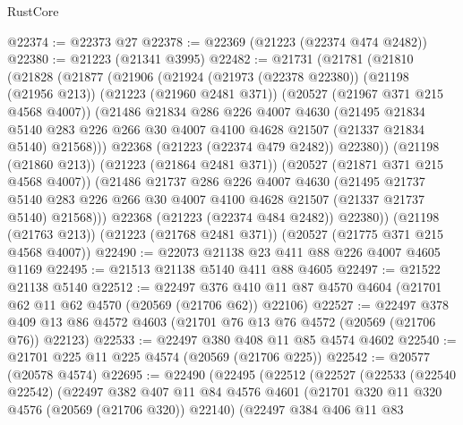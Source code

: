\begin{lexlean}{RustCore}
\begin{coremodule}
@22374 := @22373 @27
@22378 := @22369 (@21223 (@22374 @474 @2482))
@22380 := @21223 (@21341 @3995)
@22482 := @21731
    (@21781
      (@21810
        (@21828
          (@21877
            (@21906
              (@21924
                (@21973 (@22378 @22380))
                (@21198 (@21956 @213))
                (@21223 (@21960 @2481 @371))
                (@20527 (@21967 @371 @215 @4568 @4007))
                (@21486
                  @21834
                  @286
                  @226
                  @4007
                  @4630
                  (@21495
                    @21834
                    @5140
                    @283
                    @226
                    @266
                    @30
                    @4007
                    @4100
                    @4628
                    @21507
                    (@21337 @21834 @5140)
                    @21568)))
              @22368
              (@21223 (@22374 @479 @2482))
              @22380))
          (@21198 (@21860 @213))
          (@21223 (@21864 @2481 @371))
          (@20527 (@21871 @371 @215 @4568 @4007))
          (@21486
            @21737
            @286
            @226
            @4007
            @4630
            (@21495
              @21737
              @5140
              @283
              @226
              @266
              @30
              @4007
              @4100
              @4628
              @21507
              (@21337 @21737 @5140)
              @21568)))
        @22368
        (@21223 (@22374 @484 @2482))
        @22380))
    (@21198 (@21763 @213))
    (@21223 (@21768 @2481 @371))
    (@20527 (@21775 @371 @215 @4568 @4007))
@22490 := @22073 @21138 @23 @411 @88 @226 @4007 @4605 @1169
@22495 := @21513 @21138 @5140 @411 @88 @4605
@22497 := @21522 @21138 @5140
@22512 := @22497
    @376
    @410
    @11
    @87
    @4570
    @4604
    (@21701 @62 @11 @62 @4570 (@20569 (@21706 @62)) @22106)
@22527 := @22497
    @378
    @409
    @13
    @86
    @4572
    @4603
    (@21701 @76 @13 @76 @4572 (@20569 (@21706 @76)) @22123)
@22533 := @22497 @380 @408 @11 @85 @4574 @4602
@22540 := @21701 @225 @11 @225 @4574 (@20569 (@21706 @225))
@22542 := @20577 (@20578 @4574)
@22695 := @22490
    (@22495
      (@22512
        (@22527
          (@22533
            (@22540 @22542)
            (@22497
              @382
              @407
              @11
              @84
              @4576
              @4601
              (@21701 @320 @11 @320 @4576 (@20569 (@21706 @320)) @22140)
              (@22497
                @384
                @406
                @11
                @83

\end{coremodule}
\end{lexlean}
